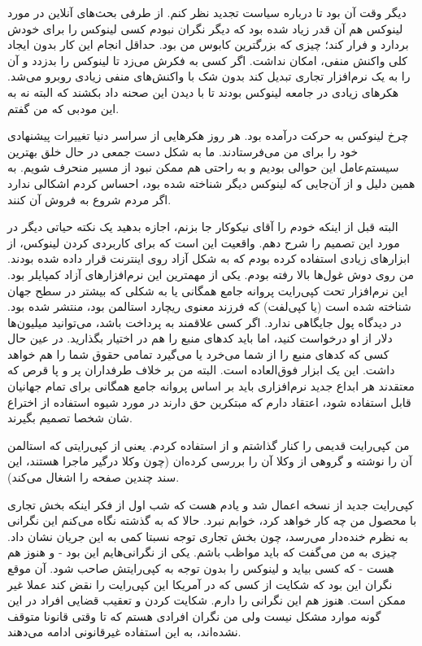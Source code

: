 دیگر وقت آن بود تا درباره سیاست  تجدید
نظر کنم. از طرفی بحث‌های آنلاین در مورد لینوکس هم آن قدر زیاد شده بود
که دیگر نگران نبودم کسی لینوکس را برای خودش بردارد و فرار کند؛ چیزی که
بزرگترین کابوس من بود. حداقل انجام این کار بدون ایجاد کلی واکنش منفی،
امکان نداشت. اگر کسی به فکرش می‌زد تا لینوکس را بدزدد و آن را به یک
نرم‌افزار تجاری تبدیل کند بدون شک با واکنش‌های منفی زیادی روبرو
می‌شد. هکرهای زیادی در جامعه لینوکس بودند تا با دیدن این صحنه داد بکشند
که  البته نه
به این مودبی که من گفتم.

چرخ لینوکس به حرکت درآمده بود. هر روز هکرهایی از سراسر دنیا تغییرات
پیشنهادی خود را برای من می‌فرستادند. ما به شکل دست جمعی در حال خلق
بهترین سیستم‌عامل این حوالی بودیم و به راحتی هم ممکن نبود از مسیر منحرف
شویم. به همین دلیل و از آن‌جایی که لینوکس دیگر شناخته شده بود، احساس
کردم اشکالی ندارد اگر مردم شروع به فروش آن کنند.

البته قبل از اینکه خودم را آقای نیکوکار جا بزنم، اجازه بدهید یک نکته
حیاتی دیگر در مورد این تصمیم را شرح دهم. واقعیت این است که برای
کاربردی کردن لینوکس، از ابزارهای زیادی استفاده کرده بودم که به شکل
آزاد روی اینترنت قرار داده شده بودند. من روی دوش غول‌ها بالا رفته
بودم. یکی از مهمترین این نرم‌افزارهای آزاد کمپایلر  بود. این
نرم‌افزار تحت کپی‌رایت پروانه جامع همگانی یا به شکلی که بیشتر در سطح جهان شناخته شده است  (یا
کپی‌لفت) که فرزند معنوی ریچارد استالمن بود،‌ منتشر شده بود. در دیدگاه
 پول جایگاهی ندارد. اگر کسی علاقمند به پرداخت باشد، می‌توانید
میلیون‌ها دلار از او درخواست کنید، اما باید کدهای منبع را هم در اختیار
بگذارید. در عین حال کسی که کدهای منبع را از شما می‌خرد یا می‌گیرد تمامی
حقوق شما را هم خواهد داشت. این یک ابزار فوق‌العاده است. البته من بر
خلاف طرفداران پر و پا قرص  که معتقدند هر ابداع جدید نرم‌افزاری
باید بر اساس پروانه جامع همگانی برای تمام جهانیان قابل استفاده شود،
اعتقاد دارم که مبتکرین حق دارند در مورد شیوه استفاده از اختراع شان
شخصا تصمیم بگیرند.

من کپی‌رایت قدیمی را کنار گذاشتم و از  استفاده کردم. یعنی از
کپی‌رایتی که استالمن آن را نوشته و گروهی از وکلا آن را بررسی کرده‌ان
(چون وکلا درگیر ماجرا هستند، این سند چندین صفحه را اشغال می‌کند).

کپی‌رایت جدید از نسخه  اعمال شد و یادم هست که شب اول از فکر
اینکه بخش تجاری با محصول من چه کار خواهد کرد، خوابم نبرد. حالا که به
گذشته نگاه می‌کنم این نگرانی به نظرم خنده‌دار می‌رسد، چون بخش تجاری توجه
نسبتا کمی به این جریان نشان داد. چیزی به من می‌گفت که باید مواظب
باشم. یکی از نگرانی‌هایم این بود - و هنوز هم هست - که کسی بیاید و
لینوکس را بدون توجه به کپی‌رایتش صاحب شود. آن موقع نگران این بود که
شکایت از کسی که در آمریکا این کپی‌رایت را نقض کند عملا غیر ممکن
است. هنوز هم این نگرانی را دارم. شکایت کردن و تعقیب قضایی افراد در این
گونه موارد مشکل نیست ولی من نگران افرادی هستم که تا وقتی قانونا متوقف
نشده‌اند، به این استفاده غیرقانونی ادامه می‌دهند.


